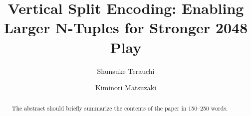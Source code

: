 \documentclass[runningheads,dvipdfmx]{llncs}
\begin{document}
%
\title{Vertical Split Encoding: Enabling Larger N-Tuples for Stronger 2048 Play}
%
%
\author{Shunsuke Terauchi \and %
Kiminori Matsuzaki}
%
%
%
\maketitle              %
%
\begin{abstract}
The abstract should briefly summarize the contents of the paper in
150--250 words.

\end{abstract}
%
%
%






% 




\end{document}

